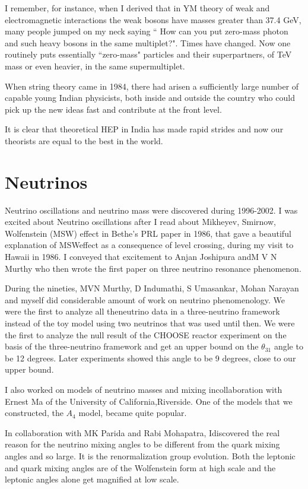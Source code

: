 I remember, for instance, when I derived that in YM theory of weak and 
electromagnetic interactions the weak bosons have masses greater than 
37.4 GeV, many people jumped on my neck saying `` How can you put 
zero-mass photon and such heavy bosons in the same multiplet?". Times 
have changed. Now one routinely puts essentially ``zero-mass" particles 
and their superpartners, of TeV mass or even heavier, in the same 
supermultiplet.

When string theory came in 1984, there had arisen a suffici\-ently large 
number of capable young Indian physicists, both inside and outside the 
country who could pick up the new ideas fast and contribute at the front 
level.

It is clear that theoretical HEP in India has made rapid strides and now 
our theorists are equal to the best in the world.

\vspace{-\topsep}
\section*{Neutrinos}

Neutrino oscillations and neutrino mass were discovered during 
1996-2002. I was excited about Neutrino oscillations after I read about 
Mikheyev, Smirnow, Wolfenstein (MSW) effect in Bethe's PRL paper in 1986, 
that gave a beautiful explanation of MSW\break effect as a consequence of 
level crossing, during my visit to Hawaii in 1986. I conveyed that 
excitement to Anjan Joshipura and\break M V N Murthy who then wrote the first 
paper on three neutrino resonance phenomenon.

During the nineties,  MVN Murthy, D Indumathi, S Umasankar, 
Mohan Narayan and myself did considerable amount of work on neutrino 
phenomenology. We were the first to analyze all the\break neutrino data in a 
three-neutrino framework instead of the toy model using two neutrinos 
that was used until then. We were the first to analyze the null result 
of the CHOOSE reactor experi\-ment on the basis of the three-neutrino 
framework and get an upper bound on the $\theta_{31}$ angle to be 12 degrees. 
Later experiments showed this angle to be 9 degrees, close to our upper 
bound.

I also worked on models of neutrino masses and mixing in\break collaboration 
with Ernest Ma of the University of California,\break Riverside. One of the 
models that we constructed, the $A_4$ model, became quite popular.

In collaboration with MK Parida and Rabi Mohapatra, I\break discovered the 
real reason for the neutrino mixing angles to be different from the 
quark mixing angles and so large. It is the renormalization group 
evolution. Both the leptonic and quark mixing angles are of the 
Wolfenstein form at high scale and the leptonic angles alone get 
magnified at low scale.
 
